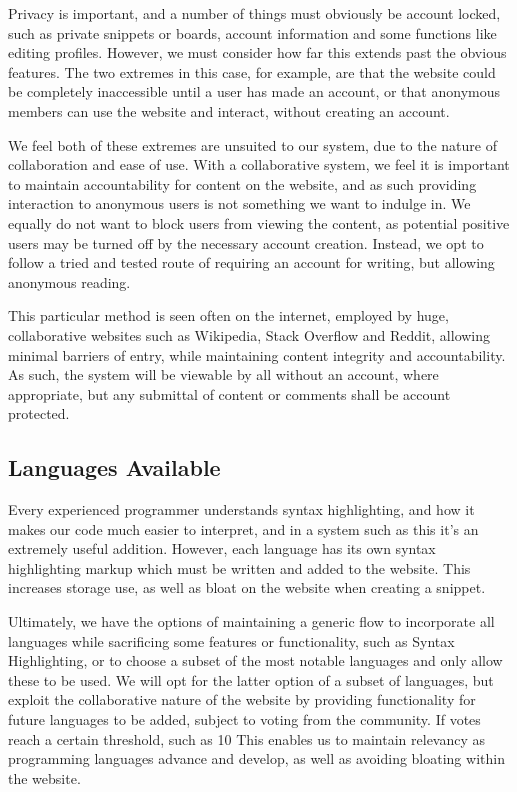 Privacy is important, and a number of things must obviously be account locked, such as private snippets or boards, account information and some functions like editing profiles. 
However, we must consider how far this extends past the obvious features. 
The two extremes in this case, for example, are that the website could be completely inaccessible until a user has made an account, or that anonymous members can use the website and interact, without creating an account.

We feel both of these extremes are unsuited to our system, due to the nature of collaboration and ease of use. 
With a collaborative system, we feel it is important to maintain accountability for content on the website, and as such providing interaction to anonymous users is not something we want to indulge in. 
We equally do not want to block users from viewing the content, as potential positive users may be turned off by the necessary account creation. 
Instead, we opt to follow a tried and tested route of requiring an account for writing, but allowing anonymous reading.

This particular method is seen often on the internet, employed by huge, collaborative websites such as Wikipedia, Stack Overflow and Reddit, allowing minimal barriers of entry, while maintaining content integrity and accountability. 
As such, the system will be viewable by all without an account, where appropriate, but any submittal of content or comments shall be account protected.

\subsection{Languages Available}

Every experienced programmer understands syntax highlighting, and how it makes our code much easier to interpret, and in a system such as this it's an extremely useful addition. 
However, each language has its own syntax highlighting markup which must be written and added to the website. This increases storage use, as well as bloat on the website when creating a snippet.

Ultimately, we have the options of maintaining a generic flow to incorporate all languages while sacrificing some features or functionality, such as Syntax Highlighting, or to choose a subset of the most notable languages and only allow these to be used. 
We will opt for the latter option of a subset of languages, but exploit the collaborative nature of the website by providing functionality for future languages to be added, subject to voting from the community.
If votes reach a certain threshold, such as 10%
This enables us to maintain relevancy as programming languages advance and develop, as well as avoiding bloating within the website.

